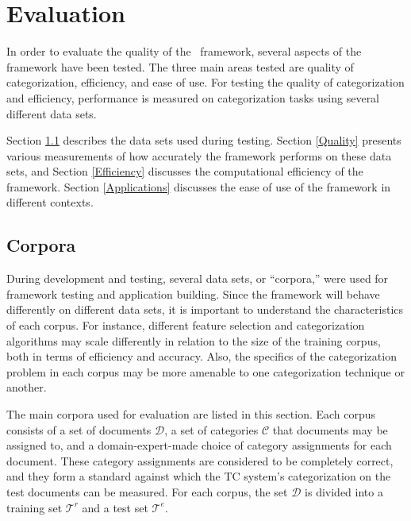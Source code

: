 \chapter{Evaluation}

\newcommand{\cats}{\mathcal{C}}
\newcommand{\docs}{\mathcal{D}}
\newcommand{\train}{\mathcal{T}^r}
\newcommand{\test}{\mathcal{T}^e}


In order to evaluate the quality of the \aicat\ framework, several
aspects of the framework have been tested.  The three main areas
tested are quality of categorization, efficiency, and ease of use.
For testing the quality of categorization and efficiency, performance
is measured on categorization tasks using several different data sets.

Section \ref{Corpora} describes the data sets used during testing.
Section \ref{Quality} presents various measurements of how accurately
the framework performs on these data sets, and Section
\ref{Efficiency} discusses the computational efficiency of the
framework.  Section \ref{Applications} discusses the ease of use of
the framework in different contexts.


\section{Corpora}
\label{Corpora}

During development and testing, several data sets, or ``corpora,''
were used for framework testing and application building.  Since the
framework will behave differently on different data sets, it is
important to understand the characteristics of each corpus.  For
instance, different feature selection and categorization algorithms
may scale differently in relation to the size of the training corpus,
both in terms of efficiency and accuracy.\cite{chakrabarti:98} Also,
the specifics of the categorization problem in each corpus may be more
amenable to one categorization technique or another.

The main corpora used for evaluation are listed in this section.  Each
corpus consists of a set of documents $\docs$, a set of categories $\cats$ that
documents may be assigned to, and a domain-expert-made choice of
category assignments for each document.  These category assignments
are considered to be completely correct, and they form a standard
against which the TC system's categorization on the test documents can
be measured.  For each corpus, the set $\docs$ is divided into a
training set $\train$ and a test set $\test$.


